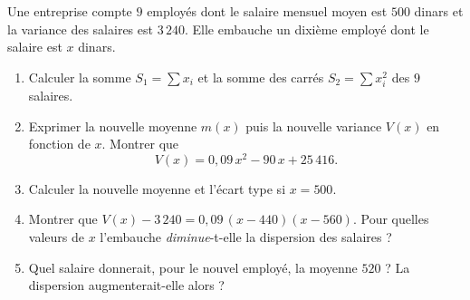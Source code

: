 
Une entreprise compte $9$ employés dont le salaire mensuel moyen est $500$ dinars et la variance des salaires est $3\,240$. Elle embauche un dixième employé dont le salaire est $x$ dinars.

\begin{enumerate}
  \item Calculer la somme $S_1=\sum x_i$ et la somme des carrés $S_2=\sum x_i^2$ des $9$ salaires.
  \item Exprimer la nouvelle moyenne $m(x)$ puis la nouvelle variance $V(x)$ en fonction de $x$. Montrer que
  $$V(x)=0{,}09\,x^2-90\,x+25\,416.$$
  \item Calculer la nouvelle moyenne et l'écart type si $x=500$.
  \item Montrer que $V(x)-3\,240=0{,}09\,(x-440)(x-560)$. Pour quelles valeurs de $x$ l'embauche \emph{diminue}-t-elle la dispersion des salaires ?
  \item Quel salaire donnerait, pour le nouvel employé, la moyenne $520$ ? La dispersion augmenterait-elle alors ?
\end{enumerate}

